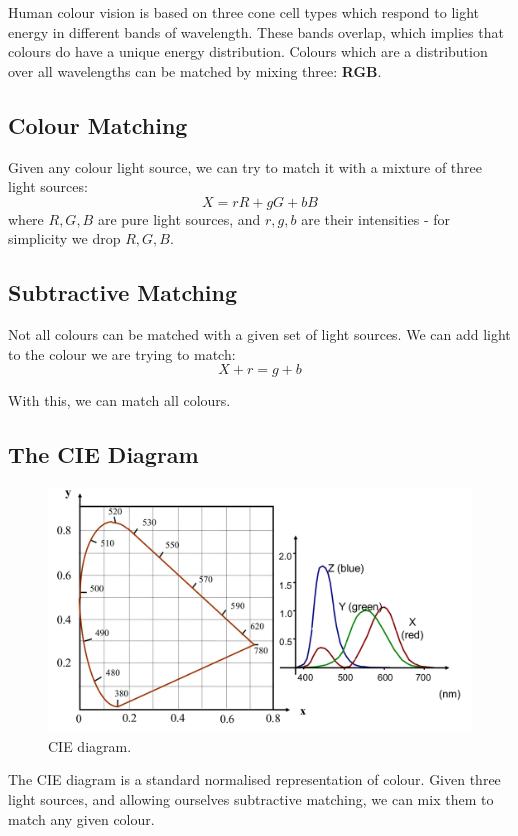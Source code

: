 \documentclass[11pt]{article}
\begin{document}
Human colour vision is based on three cone cell types which respond to light energy in different bands of wavelength.
These bands overlap, which implies that colours do have a unique energy distribution.
Colours which are a distribution over all wavelengths can be matched by mixing three: \textbf{RGB}.

\subsection{Colour Matching}
Given any colour light source, we can try to match it with a mixture of three light sources:
\[
  X = rR + gG + bB 
\]
where $R, G, B$ are pure light sources, and $r, g, b$ are their intensities - for simplicity we drop $R, G, B$.

\subsection{Subtractive Matching}
Not all colours can be matched with a given set of light sources.
We can add light to the colour we are trying to match:
\[
  X + r = g + b 
\]

With this, we can match all colours.

\subsection{The CIE Diagram}
\begin{figure}[htb!]
  \centering
  \caption{CIE diagram.}
  \includegraphics[scale=0.3]{cie}
\end{figure}
The CIE diagram is a standard normalised representation of colour.
Given three light sources, and allowing ourselves subtractive matching, we can mix them to match any given colour.
\end{document}
